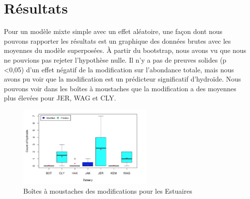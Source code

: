 \documentclass{article}
\theoremstyle{definition}
\begin{document}
\newpage

\section{Résultats}

Pour un modèle mixte simple avec un effet aléatoire, une façon dont nous pouvons rapporter les résultats est un graphique des données brutes avec les moyennes du modèle superposées. À partir du bootstrap, nous avons vu que nous ne pouvions pas rejeter l'hypothèse nulle. Il n'y a pas de preuves solides (p <0,05) d'un effet négatif de la modification sur l'abondance totale, mais nous avons pu voir que la modification est un prédicteur significatif d'hydroïde. Nous pouvons voir dans les boîtes à moustaches que la modification a des moyennes plus élevées pour JER, WAG et CLY.


\begin{figure}[!h]
\centerline{\includegraphics[width=0.6\textwidth]{boxplot.png}}
\caption{Boîtes à moustaches des modifications pour les Estuaires}
\label{exemple somme}
\end{figure}
\end{document}

